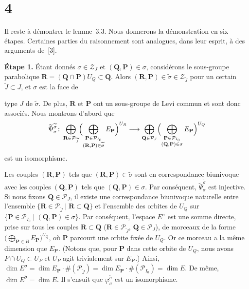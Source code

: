 \documentclass[10pt,a4paper]{article}
\theoremstyle{plain}
\theoremstyle{definition}
\theoremstyle{remark}
\newcommand{\cP}{\mathcal{P}}
\newcommand{\cZ}{\mathcal{Z}}
\newcommand{\bP}{\mathbf{P}}
\newcommand{\bQ}{\mathbf{Q}}
\newcommand{\bR}{\mathbf{R}}
\begin{document}
\section*{4}

Il reste à démontrer le lemme~3.3. Nous donnerons la démonstration en six étapes. Certaines parties du raisonnement sont analogues, dans leur esprit, à des arguments de~[3].

\smallskip
\noindent\textbf{Étape 1.} Étant donnés $\sigma \in \cZ_J$ et $(\bQ,\bP) \in \sigma$, considérons le sous-groupe parabolique $\bR = (\bQ \cap \bP)U_Q \subset \bQ$. Alors $(\bR,\bP) \in \widetilde\sigma \in \cZ_{\widetilde J}$ pour un certain $\widetilde J \subset J$, et $\sigma$ est la face de

\newpage
\noindent type $J$ de $\widetilde\sigma$. De plus, $\bR$ et $\bP$ ont un sous-groupe de Levi commun et sont donc associés. Nous montrons d'abord que
\begin{equation*}
\widetilde\Psi_{\sigma}^{\widetilde\sigma}\colon
\bigoplus_{\bR\in\cP_{\widetilde J}}
  \Bigl(\bigoplus_{\substack{\bP\in\cP_{I_0}\\(\bR,\bP)\in\widetilde\sigma}}E_{\bP}\Bigr)^{U_R}
\longrightarrow
\bigoplus_{\bQ\in\cP_J}
  \Bigl(\bigoplus_{\substack{\bP\in\cP_{I_0}\\(\bQ,\bP)\in\sigma}}E_{\bP}\Bigr)^{U_Q}
\end{equation*}
est un isomorphisme.

Les couples $(\bR,\bP)$ tels que $(\bR,\bP) \in \widetilde\sigma$ sont en correspondance biunivoque avec les couples $(\bQ,\bP)$ tels que $(\bQ,\bP) \in \sigma$. Par conséquent, $\widetilde\Psi_\sigma^{\widetilde\sigma}$ est injective. Si nous fixons $\bQ \in \cP_J$, il existe une correspondance biunivoque naturelle entre l'ensemble $\{\bR \in \cP_{\widetilde J} \mid \bR \subset \bQ\}$ et l'ensemble des orbites de $U_Q$ sur $\{\bP \in \cP_{I_0} \mid (\bQ,\bP) \in \sigma\}$. Par conséquent, l'espace $E^\sigma$ est une somme directe, prise sur tous les couples $\bR \subset \bQ$ ($\bR \in \cP_{\widetilde J}$, $\bQ \in \cP_J$), de morceaux de la forme $\bigl(\bigoplus_{\bP \in B}E_{\bP}\bigr)^{U_Q}$, où $\bP$ parcourt une orbite fixée de $U_Q$. Or ce morceau a la même dimension que $E_{\bP}$. (Notons que, pour $\bP$ dans cette orbite de $U_Q$, nous avons $P \cap U_Q \subset U_P$ et $U_P$ agit trivialement sur $E_{\bP}$.) Ainsi, $\dim E^\sigma = \dim E_{\bP} \cdot \#(\cP_{\widetilde J}) = \dim E_{\bP} \cdot \#(\cP_{I_0}) = \dim E$. De même, $\dim E^{\widetilde\sigma} = \dim E$. Il s'ensuit que $\varphi_\sigma^{\widetilde\sigma}$ est un isomorphisme.
\end{document}
